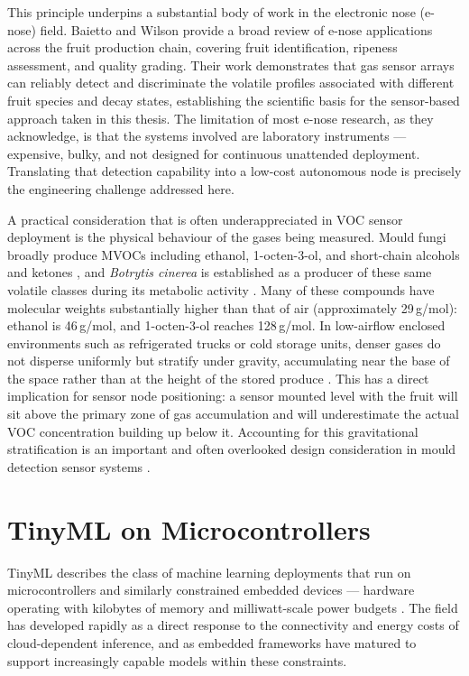 This principle underpins a substantial body of work in the electronic nose (e-nose) field. Baietto and Wilson \cite{BaiettoWilson2015} provide a broad review of e-nose applications across the fruit production chain, covering fruit identification, ripeness assessment, and quality grading. Their work demonstrates that gas sensor arrays can reliably detect and discriminate the volatile profiles associated with different fruit species and decay states, establishing the scientific basis for the sensor-based approach taken in this thesis. The limitation of most e-nose research, as they acknowledge, is that the systems involved are laboratory instruments --- expensive, bulky, and not designed for continuous unattended deployment. Translating that detection capability into a low-cost autonomous node is precisely the engineering challenge addressed here.

A practical consideration that is often underappreciated in VOC sensor deployment is the physical behaviour of the gases being measured. Mould fungi broadly produce MVOCs including ethanol, 1-octen-3-ol, and short-chain alcohols and ketones \cite{Zhao2025}, and \textit{Botrytis cinerea} is established as a producer of these same volatile classes during its metabolic activity \cite{Vandendriessche2012}. Many of these compounds have molecular weights substantially higher than that of air (approximately 29\,g/mol): ethanol is 46\,g/mol, and 1-octen-3-ol reaches 128\,g/mol. In low-airflow enclosed environments such as refrigerated trucks or cold storage units, denser gases do not disperse uniformly but stratify under gravity, accumulating near the base of the space rather than at the height of the stored produce \cite{Zhang2026}. This has a direct implication for sensor node positioning: a sensor mounted level with the fruit will sit above the primary zone of gas accumulation and will underestimate the actual VOC concentration building up below it. Accounting for this gravitational stratification is an important and often overlooked design consideration in mould detection sensor systems \cite{Suawa2025}.

\section{TinyML on Microcontrollers}

TinyML describes the class of machine learning deployments that run on microcontrollers and similarly constrained embedded devices --- hardware operating with kilobytes of memory and milliwatt-scale power budgets \cite{Dutta2021}. The field has developed rapidly as a direct response to the connectivity and energy costs of cloud-dependent inference, and as embedded frameworks have matured to support increasingly capable models within these constraints.

